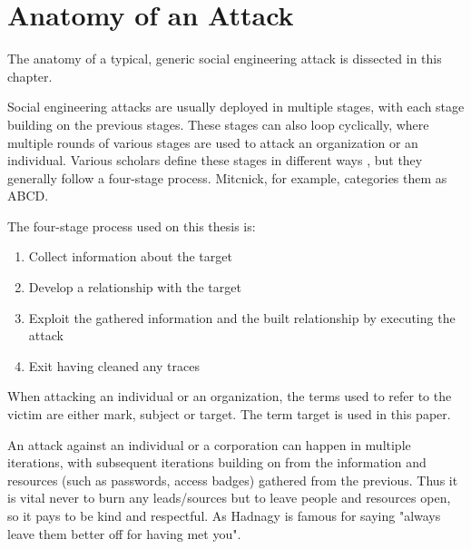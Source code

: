 



\chapter{Anatomy of an Attack\label{chapter:anatomy}}
\begin{comment}

Guides:
    - About 2 pages

TODO:
    [ ] Cover how SE attacks are cyclical

What to cover:
    - The 4-Stage process of SE
        - Gather OSINT
        - Build relationship
        - Exploit relationship / launch the attack
        - Exit / cover traces
    - Cyclical nature of SE attacks
    
Literature:
    - 

\end{comment}

The anatomy of a typical, generic social engineering attack is dissected in this chapter.

Social engineering attacks are usually deployed in multiple stages, with each stage building on the previous stages. These stages can also loop cyclically, where multiple rounds of various stages are used to attack an organization or an individual. Various scholars define these stages in different ways \citep{mouton_social_2016}, but they generally follow a four-stage process. Mitcnick, for example, categories them as ABCD.

The four-stage process used on this thesis is:

\begin{enumerate}
    \item Collect information about the target
    \item Develop a relationship with the target
    \item Exploit the gathered information and the built relationship by executing the attack
    \item Exit having cleaned any traces
\end{enumerate}

When attacking an individual or an organization, the terms used to refer to the victim are either mark, subject or target. The term target is used in this paper.

An attack against an individual or a corporation can happen in multiple iterations, with subsequent iterations building on from the information and resources (such as passwords, access badges) gathered from the previous. Thus it is vital never to burn any leads/sources but to leave people and resources open, so it pays to be kind and respectful. As Hadnagy is famous for saying "always leave them better off for having met you".

